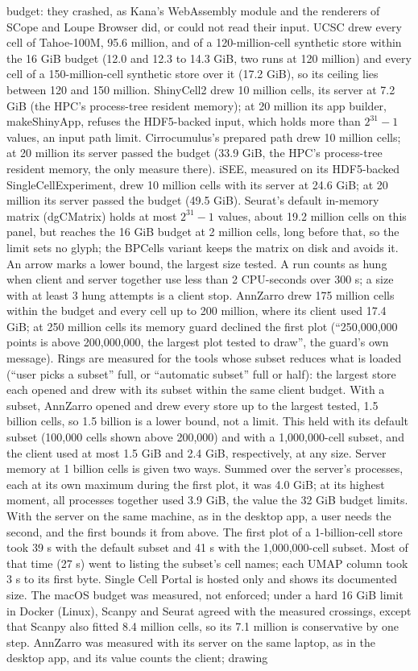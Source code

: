 \documentclass[11pt]{article}
\begin{document}
budget: they crashed, as Kana's WebAssembly module and the renderers of SCope and Loupe Browser did, or could not read their input. \newhere UCSC drew every cell of Tahoe-100M, 95.6 million, and of a 120-million-cell synthetic store within the 16 GiB budget (12.0 and 12.3 to 14.3 GiB, two runs at 120 million) and every cell of a 150-million-cell synthetic store over it (17.2 GiB), so its ceiling lies between 120 and 150 million. ShinyCell2 drew 10 million cells, its server at 7.2 GiB (the HPC's process-tree resident memory); at 20 million its app builder, makeShinyApp, refuses the HDF5-backed input, which holds more than $2^{31}-1$ values, an input path limit. Cirrocumulus's prepared path drew 10 million cells; at 20 million its server passed the budget (33.9 GiB, the HPC's process-tree resident memory, the only measure there). iSEE, measured on its HDF5-backed SingleCellExperiment, drew 10 million cells with its server at 24.6 GiB; at 20 million its server passed the budget (49.5 GiB). Seurat's default in-memory matrix (dgCMatrix) holds at most $2^{31}-1$ values, about 19.2 million cells on this panel, but reaches the 16 GiB budget at 2 million cells, long before that, so the limit sets no glyph; the BPCells variant keeps the matrix on disk and avoids it. An arrow marks a lower bound, the largest size tested. A run counts as hung when client and server together use less than 2 CPU-seconds over 300 s; a size with at least 3 hung attempts is a client stop. AnnZarro drew 175 million cells within the budget and every cell up to 200 million, where its client used 17.4 GiB; at 250 million cells its memory guard declined the first plot (``250,000,000 points is above 200,000,000, the largest plot tested to draw'', the guard's own message). Rings are measured for the tools whose subset reduces what is loaded (``user picks a subset'' full, or ``automatic subset'' full or half): the largest store each opened and drew with its subset within the same client budget. With a subset, AnnZarro opened and drew every store up to the largest tested, 1.5 billion cells, so 1.5 billion is a lower bound, not a limit. This held with its default subset (100,000 cells shown above 200,000) and with a 1,000,000-cell subset, and the client used at most 1.5 GiB and 2.4 GiB, respectively, at any size. Server memory at 1 billion cells is given two ways. Summed over the server's processes, each at its own maximum during the first plot, it was 4.0 GiB; at its highest moment, all processes together used 3.9 GiB, the value the 32 GiB budget limits. With the server on the same machine, as in the desktop app, a user needs the second, and the first bounds it from above. The first plot of a 1-billion-cell store took 39 s with the default subset and 41 s with the 1,000,000-cell subset. Most of that time (27 s) went to listing the subset's cell names; each UMAP column took 3 s to its first byte. Single Cell Portal is hosted only and shows its documented size. The macOS budget was measured, not enforced; under a hard 16 GiB limit in Docker (Linux), Scanpy and Seurat agreed with the measured crossings, except that Scanpy also fitted 8.4 million cells, so its 7.1 million is conservative by one step. AnnZarro was measured with its server on the same laptop, as in the desktop app, and its value counts the client; drawing 
\end{document}
